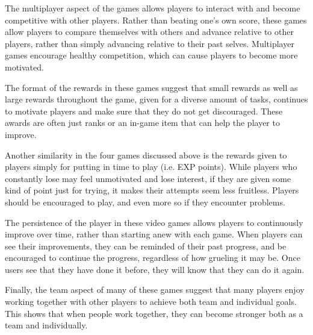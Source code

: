 The multiplayer aspect of the games allows players to interact with and become competitive with other players. Rather than beating one's own score, these games allow players to compare themselves with others and advance relative to other players, rather than simply advancing relative to their past selves. Multiplayer games encourage healthy competition, which can cause players to become more motivated.   

The format of the rewards in these games suggest that small rewards as well as large rewards throughout the game, given for a diverse amount of tasks, continues to motivate players and make sure that they do not get discouraged. These awards are often just ranks or an in-game item that can help the player to improve. 

Another similarity in the four games discussed above is the rewards given to players simply for putting in time to play (i.e. EXP points). While players who constantly lose may feel unmotivated and lose interest, if they are given some kind of point just for trying, it makes their attempts seem less fruitless. Players should be encouraged to play, and even more so if they encounter problems. 

The persistence of the player in these video games allows players to continuously improve over time, rather than starting anew with each game. When players can see their improvements, they can be reminded of their past progress, and be encouraged to continue the progress, regardless of how grueling it may be. Once users see that they have done it before, they will know that they can do it again. 

Finally, the team aspect of many of these games suggest that many players enjoy working together with other players to achieve both team and individual goals. This shows that when people work together, they can become stronger both as a team and individually.

\nocite {Carini}
\nocite {Junco}
\nocite {Kuh}
\nocite {Chen}
\nocite {Handelsman}
\nocite {Junco2011}
\nocite {Zhao}
\nocite {Kuh2001}
\nocite {Kuh2003}
\nocite {Huang}

